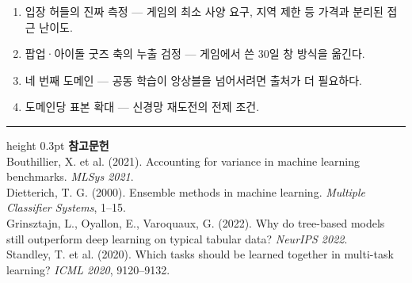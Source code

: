 \documentclass[10pt]{article}
\begin{document}
\begin{enumerate}[leftmargin=1.3em,itemsep=0.15em]
\item 입장 허들의 진짜 측정 --- 게임의 최소 사양 요구, 지역 제한 등 가격과
      분리된 접근 난이도.
\item 팝업·아이돌 굿즈 축의 누출 검정 --- 게임에서 쓴 30일 창 방식을 옮긴다.
\item 네 번째 도메인 --- 공동 학습이 앙상블을 넘어서려면 출처가 더 필요하다.
\item 도메인당 표본 확대 --- 신경망 재도전의 전제 조건.
\end{enumerate}

\vspace{0.6em}
\hrule height 0.3pt
\vspace{0.5em}
{\footnotesize
\textbf{참고문헌}\\[0.3em]
Bouthillier, X. et al. (2021). Accounting for variance in machine learning
benchmarks. \emph{MLSys 2021}.\\[0.15em]
Dietterich, T. G. (2000). Ensemble methods in machine learning.
\emph{Multiple Classifier Systems}, 1--15.\\[0.15em]
Grinsztajn, L., Oyallon, E., Varoquaux, G. (2022). Why do tree-based models still
outperform deep learning on typical tabular data? \emph{NeurIPS 2022}.\\[0.15em]
Standley, T. et al. (2020). Which tasks should be learned together in multi-task
learning? \emph{ICML 2020}, 9120--9132.
}
\end{document}
